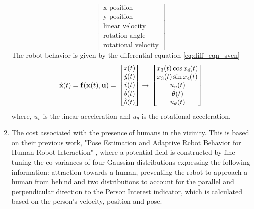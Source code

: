 \begin{enumerate}
\begin{equation}
{\begin{bmatrix}
		\text{x position}\\\text{y position}\\\text{linear velocity}\\\text{rotation angle}\\ \text{rotational velocity}
		\end{bmatrix}}		
	\end{equation}
	The robot behavior is given by the differential equation \autoref{eq:diff_eqn_sven}
	\begin{equation}
	\label{eq:diff_eqn_sven}
	\dot{\textbf{x}}(t) = 
	\mathbf{f}(\textbf{x}(t), \mathbf{u})
	=
	{%
		\vphantom{\begin{bmatrix}0\\0\\0\\0\\0\end{bmatrix}}
		\begin{bmatrix}
		\dot{x}(t)\\\dot{y}(t)\\\dot{v}(t)\\\dot{\theta}(t)\\\ddot{\theta}(t)
		\end{bmatrix}}	
	\rightarrow
	{%
		\vphantom{\begin{bmatrix}0\\0\\0\\0\\0\end{bmatrix}}
		\begin{bmatrix}
		x_3(t)\cos{x_4(t)}\\	x_3(t)\sin{x_4(t)}\\u_v(t)\\ \dot{\theta}(t) \\ u_\theta(t)
		\end{bmatrix}}		
	\end{equation}
	where, $u_v$ is the linear acceleration and $u_\theta$ is the rotational acceleration.
	\item The cost associated with the presence of humans in the vicinity. This is based on their previous work, "Pose Estimation and Adaptive Robot Behavior for Human-Robot Interaction" \cite{svenstrup_pose_estimation_2009}, where a potential field is constructed by fine-tuning the co-variances of four Gaussian distributions expressing the following information: attraction towards a human, preventing the robot to approach a human from behind and two distributions to account for the parallel and perpendicular direction to the Person Interest indicator, which is calculated based on the person's velocity, position and pose.  

\end{enumerate}
